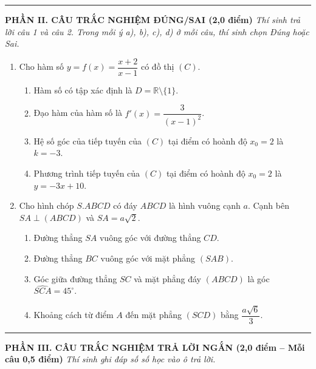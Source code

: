 \documentclass[12pt, a4paper]{article}
\begin{document}
\begin{tcolorbox}[enhanced, colback=white, colframe=blue!70!black, arc=1.5mm, title=\textbf{TRƯỜNG THCS\&THPT HỒNG VÂN -- ĐỀ KIỂM TRA CUỐI NĂM TOÁN 11 (MÃ ĐỀ 101)}]
\vspace{5pt}
\hrule
\vspace{5pt}

\textbf{\large PHẦN II. CÂU TRẮC NGHIỆM ĐÚNG/SAI (2,0 điểm)}
\textit{Thí sinh trả lời câu 1 và câu 2. Trong mỗi ý a), b), c), d) ở mỗi câu, thí sinh chọn Đúng hoặc Sai.}

\begin{enumerate}[label=\textbf{Câu \arabic*.}]
    \item Cho hàm số $y = f(x) = \dfrac{x + 2}{x - 1}$ có đồ thị $(C)$.
    \begin{enumerate}[label=\alph*)]
        \item Hàm số có tập xác định là $D = \mathbb{R} \setminus \{1\}$.
        \item Đạo hàm của hàm số là $f'(x) = \dfrac{3}{(x - 1)^2}$.
        \item Hệ số góc của tiếp tuyến của $(C)$ tại điểm có hoành độ $x_0 = 2$ là $k = -3$.
        \item Phương trình tiếp tuyến của $(C)$ tại điểm có hoành độ $x_0 = 2$ là $y = -3x + 10$.
    \end{enumerate}

    \item Cho hình chóp $S.ABCD$ có đáy $ABCD$ là hình vuông cạnh $a$. Cạnh bên $SA \perp (ABCD)$ và $SA = a\sqrt{2}$.
    \begin{enumerate}[label=\alph*)]
        \item Đường thẳng $SA$ vuông góc với đường thẳng $CD$.
        \item Đường thẳng $BC$ vuông góc với mặt phẳng $(SAB)$.
        \item Góc giữa đường thẳng $SC$ và mặt phẳng đáy $(ABCD)$ là góc $\widehat{SCA} = 45^\circ$.
        \item Khoảng cách từ điểm $A$ đến mặt phẳng $(SCD)$ bằng $\dfrac{a\sqrt{6}}{3}$.
    \end{enumerate}
\end{enumerate}

\vspace{5pt}
\hrule
\vspace{5pt}

\textbf{\large PHẦN III. CÂU TRẮC NGHIỆM TRẢ LỜI NGẮN (2,0 điểm -- Mỗi câu 0,5 điểm)}
\textit{Thí sinh ghi đáp số số học vào ô trả lời.}


\end{tcolorbox}
\end{document}
